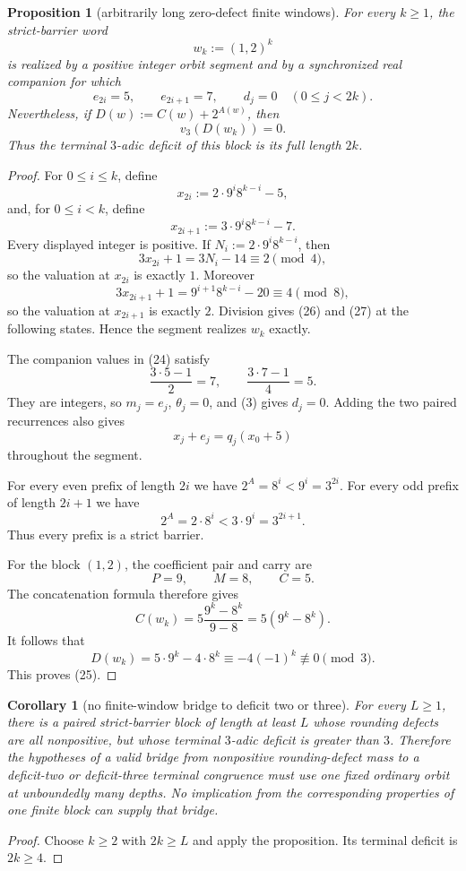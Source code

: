 \documentclass[11pt]{article}
\newtheorem{proposition}[theorem]{Proposition}
\newtheorem{corollary}[theorem]{Corollary}
\begin{document}
\begin{proposition}[arbitrarily long zero-defect finite windows]
For every $k\geq1$, the strict-barrier word
\[
  w_k:=(1,2)^k
  \tag{23}
\]
is realized by a positive integer orbit segment and by a synchronized real
companion for which
\[
  e_{2i}=5,
  \qquad e_{2i+1}=7,
  \qquad d_j=0
  \quad(0\leq j<2k).
  \tag{24}
\]
Nevertheless, if $D(w):=C(w)+2^{A(w)}$, then
\[
  v_3(D(w_k))=0.
  \tag{25}
\]
Thus the terminal $3$-adic deficit of this block is its full length $2k$.
\end{proposition}

\begin{proof}
For $0\leq i\leq k$, define
\[
  x_{2i}:=2\cdot9^i8^{k-i}-5,
  \tag{26}
\]
and, for $0\leq i<k$, define
\[
  x_{2i+1}:=3\cdot9^i8^{k-i}-7.
  \tag{27}
\]
Every displayed integer is positive.  If
$N_i:=2\cdot9^i8^{k-i}$, then
\[
  3x_{2i}+1=3N_i-14\equiv2\pmod4,
\]
so the valuation at $x_{2i}$ is exactly $1$.  Moreover
\[
  3x_{2i+1}+1=9^{i+1}8^{k-i}-20\equiv4\pmod8,
\]
so the valuation at $x_{2i+1}$ is exactly $2$.  Division gives (26) and
(27) at the following states.  Hence the segment realizes $w_k$ exactly.

The companion values in (24) satisfy
\[
  \frac{3\cdot5-1}{2}=7,
  \qquad
  \frac{3\cdot7-1}{4}=5.
\]
They are integers, so $m_j=e_j$, $\theta_j=0$, and (3) gives $d_j=0$.
Adding the two paired recurrences also gives
\[
  x_j+e_j=q_j(x_0+5)
\]
throughout the segment.

For every even prefix of length $2i$ we have
$2^{A}=8^i<9^i=3^{2i}$.  For every odd prefix of length $2i+1$ we have
\[
  2^{A}=2\cdot8^i<3\cdot9^i=3^{2i+1}.
\]
Thus every prefix is a strict barrier.

For the block $(1,2)$, the coefficient pair and carry are
\[
  P=9,
  \qquad M=8,
  \qquad C=5.
\]
The concatenation formula therefore gives
\[
  C(w_k)=5\frac{9^k-8^k}{9-8}=5(9^k-8^k).
\]
It follows that
\[
  D(w_k)=5\cdot9^k-4\cdot8^k
  \equiv-4(-1)^k\not\equiv0\pmod3.
\]
This proves (25).
\end{proof}

\begin{corollary}[no finite-window bridge to deficit two or three]
For every $L\geq1$, there is a paired strict-barrier block of length at
least $L$ whose rounding defects are all nonpositive, but whose terminal
$3$-adic deficit is greater than $3$.  Therefore the hypotheses of a valid
bridge from nonpositive rounding-defect mass to a deficit-two or
deficit-three terminal congruence must use one fixed ordinary orbit at
unboundedly many depths.  No implication from the corresponding properties
of one finite block can supply that bridge.
\end{corollary}

\begin{proof}
Choose $k\geq2$ with $2k\geq L$ and apply the proposition.  Its terminal
deficit is $2k\geq4$.
\end{proof}
\end{document}
